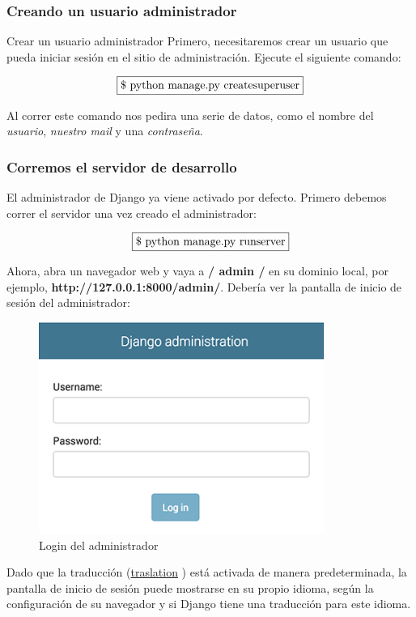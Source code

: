 \documentclass[10pt]{article}
\newcommand{\django}[1]{{\textcolor{G}{Django} #1}}
\begin{document}
\subsubsection*{Creando un usuario administrador}

Crear un usuario administrador Primero, necesitaremos crear un usuario que pueda iniciar sesión en el sitio de administración. Ejecute el siguiente comando:

$$\fbox{\$ python manage.py createsuperuser}$$

Al correr este comando nos pedira una serie de datos, como el nombre del \textit{usuario}, \textit{nuestro mail} y una \textit{contraseña}.

\subsubsection*{Corremos el servidor de desarrollo}
El administrador de \django{} ya viene activado por defecto. 
Primero debemos correr el servidor una vez creado el administrador:

$$\fbox{\$ python manage.py runserver}$$


Ahora, abra un navegador web y vaya a \textbf{/ admin /} en su dominio local, por ejemplo, \textbf{http://127.0.0.1:8000/admin/}. Debería ver la pantalla de inicio de sesión del administrador:

\begin{figure}[H]
\begin{center}
\includegraphics[scale=0.9]{figuras/325/img1.png}
\caption{Login del administrador}
\end{center}
\end{figure}


Dado que la traducción ({\href{https://docs.djangoproject.com/en/3.0/topics/i18n/translation/}{\textcolor{B}{traslation}}}
) está activada de manera predeterminada, la pantalla de inicio de sesión puede mostrarse en su propio idioma, según la configuración de su navegador y si \django{} tiene una traducción para este idioma.
\end{document}
